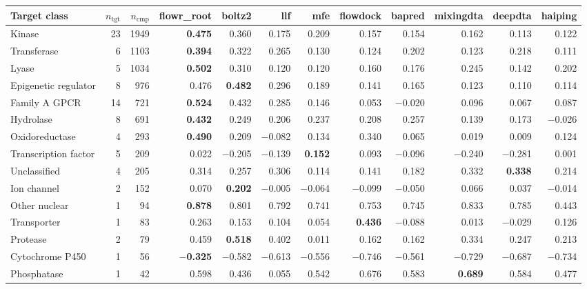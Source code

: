 \begin{tabular}{l r r r r r r r r r r r}
\toprule
Target class & $n_{\mathrm{tgt}}$ & $n_{\mathrm{cmp}}$ & \textbf{flowr\_root} & \textbf{boltz2} & \textbf{llf} & \textbf{mfe} & \textbf{flowdock} & \textbf{bapred} & \textbf{mixingdta} & \textbf{deepdta} & \textbf{haiping} \\
\midrule
Kinase & 23 & 1949 & \textbf{0.475} & 0.360 & 0.175 & 0.209 & 0.157 & 0.154 & 0.162 & 0.113 & 0.122 \\
Transferase & 6 & 1103 & \textbf{0.394} & 0.322 & 0.265 & 0.130 & 0.124 & 0.202 & 0.123 & 0.218 & 0.111 \\
Lyase & 5 & 1034 & \textbf{0.502} & 0.310 & 0.120 & 0.120 & 0.160 & 0.176 & 0.245 & 0.142 & 0.202 \\
Epigenetic regulator & 8 & 976 & 0.476 & \textbf{0.482} & 0.296 & 0.189 & 0.141 & 0.165 & 0.123 & 0.110 & 0.114 \\
Family A GPCR & 14 & 721 & \textbf{0.524} & 0.432 & 0.285 & 0.146 & 0.053 & $-$0.020 & 0.096 & 0.067 & 0.087 \\
Hydrolase & 8 & 691 & \textbf{0.432} & 0.249 & 0.206 & 0.237 & 0.208 & 0.257 & 0.139 & 0.173 & $-$0.026 \\
Oxidoreductase & 4 & 293 & \textbf{0.490} & 0.209 & $-$0.082 & 0.134 & 0.340 & 0.065 & 0.019 & 0.009 & 0.124 \\
Transcription factor & 5 & 209 & 0.022 & $-$0.205 & $-$0.139 & \textbf{0.152} & 0.093 & $-$0.096 & $-$0.240 & $-$0.281 & 0.001 \\
Unclassified & 4 & 205 & 0.314 & 0.257 & 0.306 & 0.114 & 0.141 & 0.182 & 0.332 & \textbf{0.338} & 0.214 \\
Ion channel & 2 & 152 & 0.070 & \textbf{0.202} & $-$0.005 & $-$0.064 & $-$0.099 & $-$0.050 & 0.066 & 0.037 & $-$0.014 \\
Other nuclear & 1 & 94 & \textbf{0.878} & 0.801 & 0.792 & 0.741 & 0.753 & 0.745 & 0.833 & 0.785 & 0.443 \\
Transporter & 1 & 83 & 0.263 & 0.153 & 0.104 & 0.054 & \textbf{0.436} & $-$0.088 & 0.013 & $-$0.029 & 0.126 \\
Protease & 2 & 79 & 0.459 & \textbf{0.518} & 0.402 & 0.011 & 0.162 & 0.162 & 0.334 & 0.247 & 0.213 \\
Cytochrome P450 & 1 & 56 & \textbf{$-$0.325} & $-$0.582 & $-$0.613 & $-$0.556 & $-$0.746 & $-$0.561 & $-$0.729 & $-$0.687 & $-$0.734 \\
Phosphatase & 1 & 42 & 0.598 & 0.436 & 0.055 & 0.542 & 0.676 & 0.583 & \textbf{0.689} & 0.584 & 0.477 \\
\bottomrule
\end{tabular}
